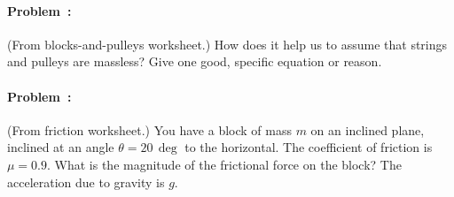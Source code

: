 \documentclass[12pt]{article}
\begin{document}
\vfill

\paragraph{Problem~\theproblem:}%
(From blocks-and-pulleys worksheet.) How does it help us to assume
that strings and pulleys are massless? Give one good, specific
equation or reason.

\vfill

\paragraph{Problem~\theproblem:}%
(From friction worksheet.) You have a block of mass $m$ on an inclined
plane, inclined at an angle $\theta=20\,\deg$ to the horizontal. The
coefficient of friction is $\mu=0.9$. What is the magnitude of the
frictional force on the block? The acceleration due to gravity is $g$.

\vfill
~
\end{document}
